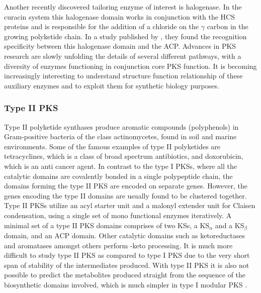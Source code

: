 			Another recently discovered tailoring enzyme of interest is halogenase. In the curacin system this halogenase domain works in conjunction with the HCS proteins and is responsible for the addition of a chloride on the $\gamma$ carbon in the growing polyketide chain. In a study published by \textcite{Busche2012}, they found the recognition specificity between this halogenase domain and the ACP. Advances in PKS research are slowly unfolding the details of several different pathways, with a diversity of enzymes functioning in conjunction core PKS function. It is becoming increasingly interesting to understand structure function relationship of these auxiliary enzymes and to exploit them for synthetic biology purposes.
			
			\subsubsection{Type II PKS}
			\label{sec: typeIIPKS}
			Type II polyketide synthases produce aromatic compounds (polyphenols) in Gram-positive bacteria of the class actinomycetes, found in soil and marine environments. Some of the famous examples of type II polyketides are tetracyclines, which is a class of broad spectrum antibiotics, and doxorubicin, which is an anti cancer agent. In contrast to the type I PKSs, where all the catalytic domains are covalently bonded in a single polypeptide chain, the domains forming the type II PKS are encoded on separate genes. However, the genes encoding the type II domains are usually found to be clustered together. Type II PKSs utilize an acyl starter unit and a malonyl extender unit for Claisen condensation, using a single set of mono functional enzymes iteratively. A minimal set of a type II PKS domains comprises of two KSs, a KS$_{\alpha}$ and a KS$_{\beta}$ domain, and an ACP domain. Other catalytic domains such as ketoreductases and aromatases amongst others perform \bet-keto processing. It is much more difficult to study type II PKS as compared to type I PKS due to the very short span of stability of the intermediates produced. With type II PKS it is also not possible to predict the metabolites produced straight from the sequence of the biosynthetic domains involved, which is much simpler in type I modular PKS \parencite{Hertweck2007}. 

